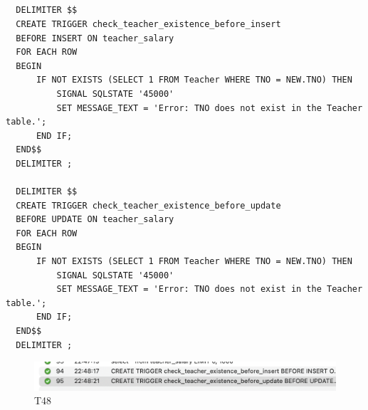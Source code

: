 \documentclass[UTF8]{ctexart}
\begin{document}
\subsection{}
\begin{lstlisting}
  DELIMITER $$
  CREATE TRIGGER check_teacher_existence_before_insert
  BEFORE INSERT ON teacher_salary
  FOR EACH ROW
  BEGIN
      IF NOT EXISTS (SELECT 1 FROM Teacher WHERE TNO = NEW.TNO) THEN
          SIGNAL SQLSTATE '45000'
          SET MESSAGE_TEXT = 'Error: TNO does not exist in the Teacher table.';
      END IF;
  END$$
  DELIMITER ;
  
  DELIMITER $$
  CREATE TRIGGER check_teacher_existence_before_update
  BEFORE UPDATE ON teacher_salary
  FOR EACH ROW
  BEGIN
      IF NOT EXISTS (SELECT 1 FROM Teacher WHERE TNO = NEW.TNO) THEN
          SIGNAL SQLSTATE '45000'
          SET MESSAGE_TEXT = 'Error: TNO does not exist in the Teacher table.';
      END IF;
  END$$
  DELIMITER ;
\end{lstlisting}
\begin{figure}[H]
  \centering
  \includegraphics[scale=0.7]{pics/48.png}
  \caption*{T48}
\end{figure}
\end{document}
